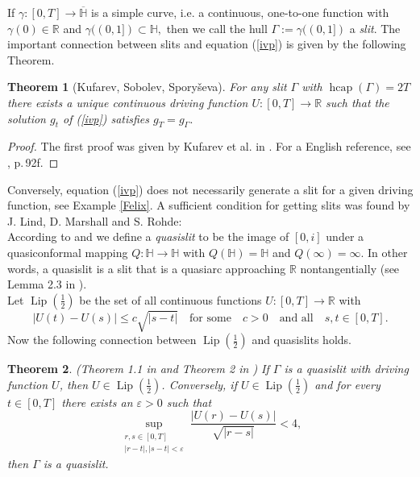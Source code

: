 \documentclass[11pt]{amsart}
\numberwithin{equation}{section}
\theoremstyle{plain}
\newtheorem{satz}{Theorem}
\theoremstyle{definition}
\begin{document}
If $\gamma:[0,T]\to \overline{\mathbb H}$ is a simple curve, i.e. a continuous, one-to-one function with $\gamma(0)\in{\mathbb R}$ and $\gamma((0,1])\subset {\mathbb H},$ then we call the hull $\Gamma:=\gamma((0,1])$ a \textit{slit}. The important connection between slits and equation (\ref{ivp}) is given by the following Theorem.

\begin{satz}[Kufarev, Sobolev, Spory{\v{s}}eva]\label{slitex}
 For any slit $\Gamma$ with ${\operatorname{hcap}}(\Gamma)=2T$ there exists a unique continuous driving function $U:[0,T]\to{\mathbb R}$ such that the solution $g_t$ of (\ref{ivp}) satisfies $g_T=g_\Gamma.$
\end{satz}
\begin{proof}
 The first proof was given by Kufarev et al. in \cite{MR0257336}. For a English reference, see \cite{Lawler:2005}, p.\,92f.
\end{proof}

Conversely, equation (\ref{ivp}) does not necessarily generate a slit for a given driving function, see Example \ref{Felix}.
A sufficient condition for getting slits was found by J. Lind, D. Marshall and S. Rohde:\\

According to \cite{MarshallRohde:2005} and \cite{Lind:2005} we define a \textit{quasislit} to be the image of $[0,i]$ under a quasiconformal mapping $Q:{\mathbb H}\to{\mathbb H}$ with $Q({\mathbb H})={\mathbb H}$ and $Q(\infty)=\infty.$ In other words, a quasislit is a slit that is a quasiarc approaching ${\mathbb R}$ nontangentially (see Lemma 2.3 in \cite{MarshallRohde:2005}). \\

Let ${\operatorname{Lip}\left( \frac{1}{2}\right)}$ be the set of all continuous functions $U:[0,T]\to{\mathbb R}$ with $$|U(t)-U(s)|\leq c\sqrt{|s-t|} \quad \text{for some}\quad c>0 \quad \text{and all} \quad s,t\in[0,T].$$
Now the following connection between ${\operatorname{Lip}\left( \frac{1}{2}\right)}$ and quasislits holds.

\begin{satz}\label{lmr}(Theorem 1.1 in \cite{MarshallRohde:2005} and Theorem 2 in \cite{Lind:2005})
 If $\Gamma$ is a quasislit with driving function $U$, then $U \in {\operatorname{Lip}\left( \frac{1}{2}\right)}$. Conversely, if $U \in {\operatorname{Lip}\left( \frac{1}{2}\right)}$ and for every $t\in[0,T]$ there exists an ${\varepsilon}>0$  such that
$$ \sup_{\substack{r,s\in[0,T]\\ |r-t|,|s-t|<{\varepsilon}}}\frac{|U(r)-U(s)|}{\sqrt{|r-s|}}<4, $$
then $\Gamma$ is a quasislit.
\end{satz}
\end{document}
